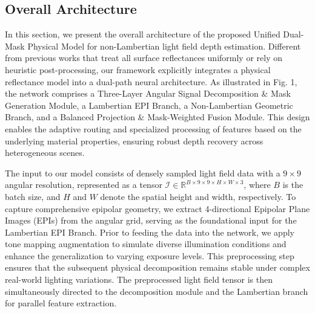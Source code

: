 \documentclass[lettersize,journal]{IEEEtran}
\begin{document}
\subsection{Overall Architecture}

In this section, we present the overall architecture of the proposed Unified Dual-Mask Physical Model for non-Lambertian light field depth estimation. Different from previous works \cite{syntacdeno} that treat all surface reflectances uniformly or rely on heuristic post-processing, our framework explicitly integrates a physical reflectance model into a dual-path neural architecture. As illustrated in Fig. 1, the network comprises a Three-Layer Angular Signal Decomposition \& Mask Generation Module, a Lambertian EPI Branch, a Non-Lambertian Geometric Branch, and a Balanced Projection \& Mask-Weighted Fusion Module. This design enables the adaptive routing and specialized processing of features based on the underlying material properties, ensuring robust depth recovery across heterogeneous scenes.

The input to our model consists of densely sampled light field data with a $9 \times 9$ angular resolution, represented as a tensor $\mathcal{I} \in \mathbb{R}^{B \times 9 \times 9 \times H \times W \times 3}$, where $B$ is the batch size, and $H$ and $W$ denote the spatial height and width, respectively. To capture comprehensive epipolar geometry, we extract 4-directional Epipolar Plane Images (EPIs) from the angular grid, serving as the foundational input for the Lambertian EPI Branch. Prior to feeding the data into the network, we apply tone mapping augmentation to simulate diverse illumination conditions and enhance the generalization to varying exposure levels. This preprocessing step ensures that the subsequent physical decomposition remains stable under complex real-world lighting variations. The preprocessed light field tensor is then simultaneously directed to the decomposition module and the Lambertian branch for parallel feature extraction.
\end{document}
